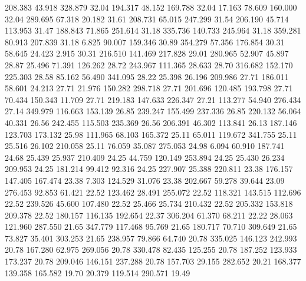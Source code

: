  208.383   43.918  328.879        32.04
 194.317   48.152  169.788        32.04
  17.163   78.609  160.000        32.04
 289.695   67.318   20.182        31.61
 208.731   65.015  247.299        31.54
 206.190   45.714  113.953        31.47
 188.843   71.865  251.614        31.18
 335.736  140.733  245.964        31.18
 359.281   80.913  207.839        31.18
   6.825   90.007  159.346        30.89
 354.279   57.356  176.854        30.31
  58.645   24.423    2.915        30.31
 216.510  141.469  217.828        29.01
 280.965   52.907   45.897        28.87
  25.496   71.391  126.262        28.72
 243.967  111.365   28.633        28.70
 316.682  152.170  225.303        28.58
  85.162   56.490  341.095        28.22
  25.398   26.196  209.986        27.71
 186.011   58.601   24.213        27.71
  21.976  150.282  298.718        27.71
 201.696  120.485  193.798        27.71
  70.434  150.343   11.709        27.71
 219.183  147.633  226.347        27.21
 113.277   54.940  276.434        27.14
 349.979  116.663  153.139        26.85
 239.247  155.499  237.336        26.85
 220.132   56.064   40.331        26.56
 242.455  115.503  235.369        26.56
 206.391   46.302  113.841        26.13
 187.146  123.703  173.132        25.98
 111.965   68.103  165.372        25.11
  65.011  119.672  341.755        25.11
  25.516   26.102  210.058        25.11
  76.059   35.087  275.053        24.98
   6.094   60.910  187.741        24.68
  25.439   25.937  210.409        24.25
  44.759  120.149  253.894        24.25
  25.430   26.234  209.953        24.25
 181.214   99.412   92.316        24.25
 227.907   25.388  220.811        23.38
 176.157  147.405  167.474        23.38
   7.303  124.529   31.076        23.38
 202.667   59.278   39.644        23.09
 276.453   92.853   61.421        22.52
 123.462   28.491  255.072        22.52
 118.321  143.515  112.696        22.52
 239.526   45.600  107.480        22.52
  25.466   25.734  210.432        22.52
 205.332  153.818  209.378        22.52
 180.157  116.135  192.654        22.37
 306.204   61.370   68.211        22.22
  28.063  121.960  287.550        21.65
 347.779  117.468   95.769        21.65
 180.717   70.710  309.649        21.65
  73.827   35.401  303.253        21.65
 238.957   79.866   64.740        20.78
 335.025  146.123  242.993        20.78
 167.280   62.975  269.056        20.78
 330.478   82.435  125.255        20.78
 187.252  123.933  173.237        20.78
 209.046  146.151  237.288        20.78
 157.703   29.155  282.652        20.21
 168.377  139.358  165.582        19.70
  20.379  119.514  290.571        19.49
